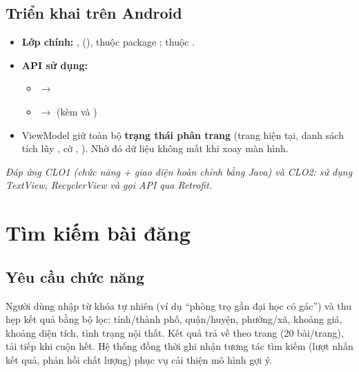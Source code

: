 \subsection{Triển khai trên Android}
\begin{itemize}
    \item \textbf{Lớp chính:} , 
    (),  thuộc package
    ;  thuộc .
    \item \textbf{API sử dụng:}
    \begin{itemize}
        \item {} $\rightarrow$
        \item {} $\rightarrow$
         (kèm  và
        )
    \end{itemize}
    \item ViewModel giữ toàn bộ \textbf{trạng thái phân trang} (trang hiện tại,
    danh sách tích lũy , cờ ,
    ). Nhờ đó dữ liệu không mất khi xoay màn hình.
\end{itemize}

\textit{Đáp ứng CLO1 (chức năng + giao diện hoàn chỉnh bằng Java) và CLO2: sử
dụng TextView, RecyclerView và gọi API qua Retrofit.}

\section{Tìm kiếm bài đăng}

\subsection{Yêu cầu chức năng}
Người dùng nhập từ khóa tự nhiên (ví dụ ``phòng trọ gần đại học có gác'') và
thu hẹp kết quả bằng bộ lọc: tỉnh/thành phố, quận/huyện, phường/xã, khoảng
giá, khoảng diện tích, tình trạng nội thất. Kết quả trả về theo trang
(20 bài/trang), tải tiếp khi cuộn hết. Hệ thống đồng thời ghi nhận tương tác
tìm kiếm (lượt nhấn kết quả, phản hồi chất lượng) phục vụ cải thiện mô hình
gợi ý.

